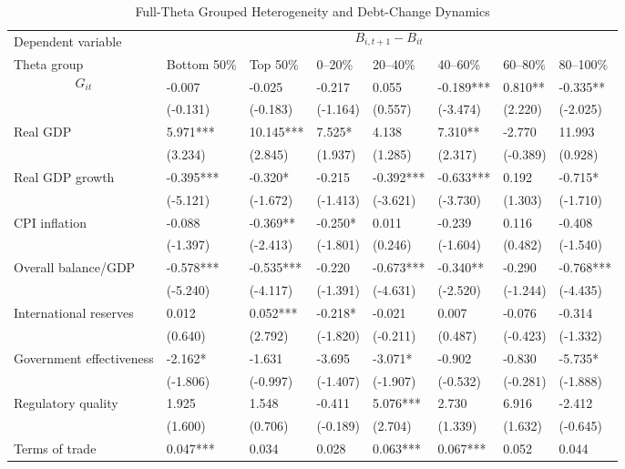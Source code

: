 \begin{table}[H]\centering
\begin{threeparttable}
\caption{Full-Theta Grouped Heterogeneity and Debt-Change Dynamics}
\label{tab:theta_group_heterogeneity_debt}
\scriptsize
\begin{tabularx}{\textwidth}{lYYYYYYY}
\toprule
Dependent variable &  \\
\cmidrule(lr){2-8}
Theta group & Bottom 50\% & Top 50\% & 0--20\% & 20--40\% & 40--60\% & 60--80\% & 80--100\% \\
\midrule
$$G_{it}$$ & -0.007 & -0.025 & -0.217 & 0.055 & -0.189*** & 0.810** & -0.335** \\
  & (-0.131) & (-0.183) & (-1.164) & (0.557) & (-3.474) & (2.220) & (-2.025) \\
Real GDP & 5.971*** & 10.145*** & 7.525* & 4.138 & 7.310** & -2.770 & 11.993 \\
  & (3.234) & (2.845) & (1.937) & (1.285) & (2.317) & (-0.389) & (0.928) \\
Real GDP growth & -0.395*** & -0.320* & -0.215 & -0.392*** & -0.633*** & 0.192 & -0.715* \\
  & (-5.121) & (-1.672) & (-1.413) & (-3.621) & (-3.730) & (1.303) & (-1.710) \\
CPI inflation & -0.088 & -0.369** & -0.250* & 0.011 & -0.239 & 0.116 & -0.408 \\
  & (-1.397) & (-2.413) & (-1.801) & (0.246) & (-1.604) & (0.482) & (-1.540) \\
Overall balance/GDP & -0.578*** & -0.535*** & -0.220 & -0.673*** & -0.340** & -0.290 & -0.768*** \\
  & (-5.240) & (-4.117) & (-1.391) & (-4.631) & (-2.520) & (-1.244) & (-4.435) \\
International reserves & 0.012 & 0.052*** & -0.218* & -0.021 & 0.007 & -0.076 & -0.314 \\
  & (0.640) & (2.792) & (-1.820) & (-0.211) & (0.487) & (-0.423) & (-1.332) \\
Government effectiveness & -2.162* & -1.631 & -3.695 & -3.071* & -0.902 & -0.830 & -5.735* \\
  & (-1.806) & (-0.997) & (-1.407) & (-1.907) & (-0.532) & (-0.281) & (-1.888) \\
Regulatory quality & 1.925 & 1.548 & -0.411 & 5.076*** & 2.730 & 6.916 & -2.412 \\
  & (1.600) & (0.706) & (-0.189) & (2.704) & (1.339) & (1.632) & (-0.645) \\
Terms of trade & 0.047*** & 0.034 & 0.028 & 0.063*** & 0.067*** & 0.052 & 0.044 \\

\end{tabularx}
\end{threeparttable}
\end{table}
